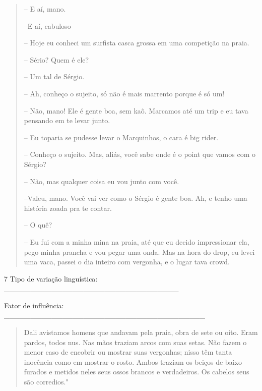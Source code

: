 \begin{quote}
-- E aí, mano.

--E aí, cabuloso

-- Hoje eu conheci um surfista casca grossa em uma competição na praia.

-- Sério? Quem é ele?

-- Um tal de Sérgio.

-- Ah, conheço o sujeito, só não é mais marrento porque é só um!

-- Não, mano! Ele é gente boa, sem kaô. Marcamos até um trip e eu tava
pensando em te levar junto.

-- Eu toparia se pudesse levar o Marquinhos, o cara é big rider.

-- Conheço o sujeito. Mas, aliás, você sabe onde é o point que vamos com
o Sérgio?

-- Não, mas qualquer coisa eu vou junto com você.

--Valeu, mano. Você vai ver como o Sérgio é gente boa. Ah, e tenho uma
história zoada pra te contar.

-- O quê?

-- Eu fui com a minha mina na praia, até que eu decido impressionar ela,
pego minha prancha e vou pegar uma onda. Mas na hora do drop, eu levei
uma vaca, passei o dia inteiro com vergonha, e o lugar tava crowd.
\end{quote}


\num{7} Tipo de variação linguística:
\_\_\_\_\_\_\_\_\_\_\_\_\_\_\_\_\_\_\_\_\_\_\_\_\_\_\_\_\_\_\_\_\_ 

Fator de influência:
\_\_\_\_\_\_\_\_\_\_\_\_\_\_\_\_\_\_\_\_\_\_\_\_\_\_\_\_\_\_\_\_\_\_\_\_\_\_ 

\begin{quote}
Dali avistamos homens que andavam pela praia, obra de sete ou oito. Eram
pardos, todos nus. Nas mãos traziam arcos com suas setas. Não fazem o
menor caso de encobrir ou mostrar suas vergonhas; nisso têm tanta
inocência como em mostrar o rosto. Ambos traziam os beiços de baixo
furados e metidos neles seus ossos brancos e verdadeiros. Os cabelos
seus são corredios."
\end{quote}



